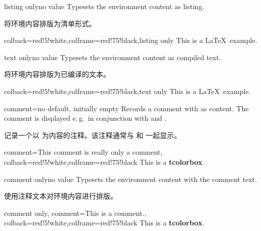 \begin{docTcbKey}{listing only}{}{no value}
Typesets the environment content as listing.

将环境内容排版为清单形式。
\begin{dispExample}
\begin{tcblisting}{colback=red!5!white,colframe=red!75!black,listing only}
This is a \LaTeX\ example.
\end{tcblisting}
\end{dispExample}
\end{docTcbKey}


\begin{docTcbKey}{text only}{}{no value}
Typesets the environment content as compiled text.

将环境内容排版为已编译的文本。
\begin{dispExample}
\begin{tcblisting}{colback=red!5!white,colframe=red!75!black,text only}
This is a \LaTeX\ example.
\end{tcblisting}
\end{dispExample}
\end{docTcbKey}



\begin{docTcbKey}{comment}{=}{no default, initially empty}
Records a comment with  as content. The comment is displayed
e.\,g.\ in conjunction with 
and .

记录一个以  为内容的注释。该注释通常与  和  一起显示。
\begin{dispExample}
\begin{tcblisting}{comment={This comment is really only a comment},
colback=red!5!white,colframe=red!75!black}
This is a \textbf{tcolorbox}.
\end{tcblisting}
\end{dispExample}
\end{docTcbKey}


\begin{docTcbKey}[][doc new=2014-11-17]{comment only}{}{no value}
Typesets the environment content with the comment text.

使用注释文本对环境内容进行排版。
\begin{dispExample}
\begin{tcblisting}{comment only,
comment={This is a comment.},
colback=red!5!white,colframe=red!75!black}
This is a \textbf{tcolorbox}.
\end{tcblisting}
\end{dispExample}
\end{docTcbKey}



